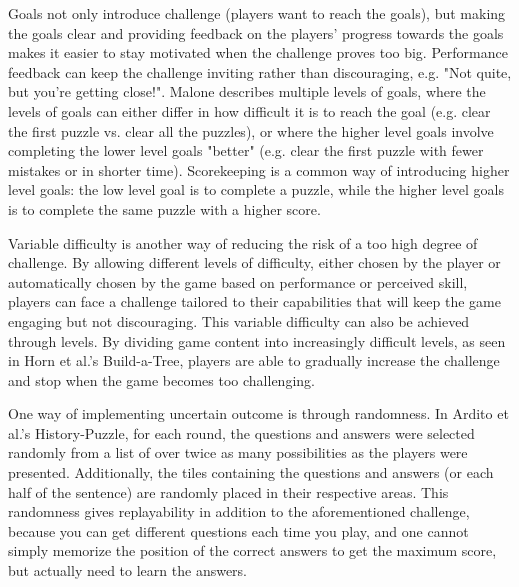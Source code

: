 Goals not only introduce challenge (players want to reach the goals), but making the goals clear and providing feedback on the players' progress towards the goals makes it easier to stay motivated when the challenge proves too big. Performance feedback can keep the challenge inviting rather than discouraging, e.g. "Not quite, but you're getting close!". Malone describes multiple levels of goals, where the levels of goals can either differ in how difficult it is to reach the goal (e.g. clear the first puzzle vs. clear all the puzzles), or where the higher level goals involve completing the lower level goals "better" (e.g. clear the first puzzle with fewer mistakes or in shorter time). Scorekeeping is a common way of introducing higher level goals: the low level goal is to complete a puzzle, while the higher level goals is to complete the same puzzle with a higher score.

Variable difficulty is another way of reducing the risk of a too high degree of challenge. By allowing different levels of difficulty, either chosen by the player or automatically chosen by the game based on performance or perceived skill, players can face a challenge tailored to their capabilities that will keep the game engaging but not discouraging. This variable difficulty can also be achieved through levels. By dividing game content into increasingly difficult levels, as seen in Horn et al.'s Build-a-Tree, players are able to gradually increase the challenge and stop when the game becomes too challenging.

One way of implementing uncertain outcome is through randomness. In Ardito et al.'s History-Puzzle, for each round, the questions and answers were selected randomly from a list of over twice as many possibilities as the players were presented. Additionally, the tiles containing the questions and answers (or each half of the sentence) are randomly placed in their respective areas. This randomness gives replayability in addition to the aforementioned challenge, because you can get different questions each time you play, and one cannot simply memorize the position of the correct answers to get the maximum score, but actually need to learn the answers. 

